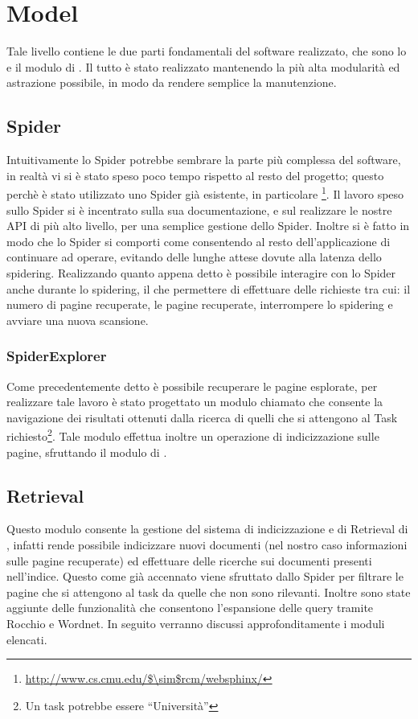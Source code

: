 \section{Model}
Tale livello contiene le due parti fondamentali del software realizzato, che sono lo  e il modulo di . Il tutto è stato realizzato mantenendo la più alta modularità ed astrazione possibile, in modo da rendere semplice la manutenzione.
\subsection{Spider}
Intuitivamente lo Spider potrebbe sembrare la parte più complessa del software, in realtà vi si è stato speso poco tempo rispetto al resto del progetto; questo perchè è stato utilizzato uno Spider già esistente, in particolare \footnote{\url{http://www.cs.cmu.edu/$\sim$rcm/websphinx/}}. Il lavoro speso sullo Spider si è incentrato sulla sua documentazione, e sul realizzare le nostre API di più alto livello, per una semplice gestione dello Spider. Inoltre si è fatto in modo che lo Spider si comporti come  consentendo al resto dell'applicazione di continuare ad operare, evitando delle lunghe attese dovute alla latenza dello spidering. Realizzando quanto appena detto è possibile interagire con lo Spider anche durante lo spidering, il che permettere di effettuare delle richieste tra cui: il numero di pagine recuperate, le pagine recuperate, interrompere lo spidering e avviare una nuova scansione.
\subsubsection{SpiderExplorer}
Come precedentemente detto è possibile recuperare le pagine esplorate, per realizzare tale lavoro è stato progettato un modulo chiamato  che consente la navigazione dei risultati ottenuti dalla ricerca di quelli che si attengono al Task richiesto\footnote{Un task potrebbe essere ``Università''}. Tale modulo effettua inoltre un operazione di indicizzazione sulle pagine, sfruttando il modulo di .
\subsection{Retrieval}
Questo modulo consente la gestione del sistema di indicizzazione e di Retrieval di , infatti rende possibile indicizzare nuovi documenti (nel nostro caso informazioni sulle pagine recuperate) ed effettuare delle ricerche sui documenti presenti nell'indice. Questo come già accennato viene sfruttato dallo Spider per filtrare le pagine che si attengono al task da quelle che non sono rilevanti. Inoltre sono state aggiunte delle funzionalità che consentono l'espansione delle query tramite Rocchio e Wordnet. In seguito verranno discussi approfonditamente i moduli elencati.

